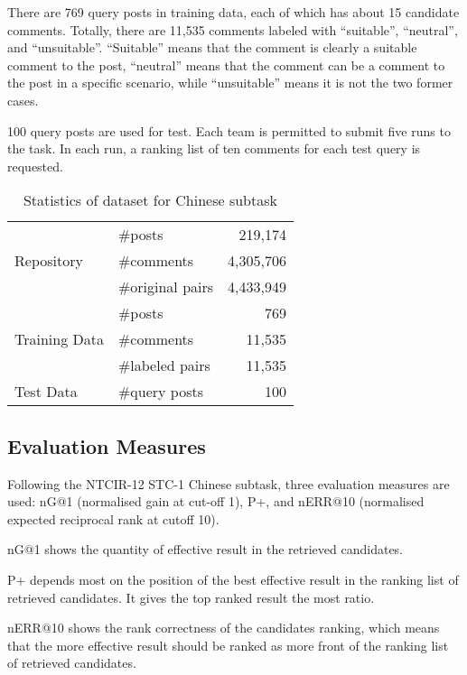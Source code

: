 \documentclass{llncs}
\begin{document}
There are 769 query posts in training data, each of which has about 15 
candidate comments. Totally, there are 11,535 comments labeled with 
“suitable”, “neutral”, and “unsuitable”. “Suitable” means that the comment 
is clearly a suitable comment to the post, “neutral” means that the comment 
can be a comment to the post in a specific scenario, while “unsuitable” means 
it is not the two former cases. 

100 query posts are used for test. Each team is permitted to submit five
runs to the task. In each run, a ranking list of ten comments for
each test query is requested. 

\begin{table}[]
\centering
\caption{Statistics of dataset for Chinese subtask}
\label{my-label}
\begin{tabular}{|l@{\quad}|l@{\quad}|@{\quad}r|}
\hline
\multirow{3}{*}{Repository}
                  & \#posts           & 219,174   \\ \cline{2-3} 
                  & \#comments        & 4,305,706 \\ \cline{2-3} 
                  & \#original pairs  & 4,433,949 \\ \hline
\multirow{3}{*}{Training Data} 
                  & \#posts           & 769       \\ \cline{2-3} 
                  & \#comments        & 11,535    \\ \cline{2-3} 
                  & \#labeled pairs   & 11,535    \\ \hline
Test Data         & \#query posts     & 100       \\ \hline
\end{tabular}
\end{table}

\subsection{Evaluation Measures}
Following the NTCIR-12 STC-1 Chinese subtask, three evaluation measures are
used: nG@1 (normalised gain at cut-off 1), P+, and nERR@10 (normalised expected reciprocal rank at cutoff 10)\cite{Lifeng}.

nG@1 shows the quantity of effective result in the retrieved candidates. 

P+ depends most on the position of the best effective result in the
ranking list of retrieved candidates. It gives the top ranked result
the most ratio. 

nERR@10 shows the rank correctness of the candidates ranking,
which means that the more effective result should be ranked as
more front of the ranking list of retrieved candidates.
\end{document}
